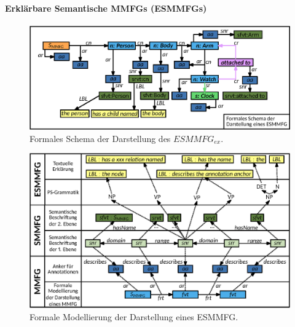 \paragraph{Erklärbare Semantische MMFGs (ESMMFGs)}
\label{sec2:sota:par:explainable-smmfgs}

\begin{figure}[htb]
    \centering
    \includegraphics[width=\textwidth]{chapter/chapter_2/mmfg/explainable/formal-schema-esmmfg-ex.eps}
    \caption{Formales Schema der Darstellung des $ESMMFG_{ex}$.}
    \label{sec2:sota:subsec:fz-explainablity:fig:mmfg-formal-schema-esmmfg}
\end{figure}

\begin{figure}[htb]
    \centering
    \includegraphics[width=\textwidth]{chapter/chapter_2/mmfg/explainable/formal-model-syntactic-esmmfg.eps}
    \caption{Formale Modellierung der Darstellung eines ESMMFG.}
    \label{sec2:sota:subsec:fz-explainablity:fig:mmfg-formal-model-esmmfg}
\end{figure}